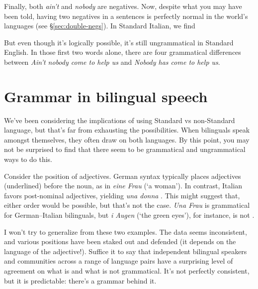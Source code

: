 Finally, both \textit{ain't} and \textit{nobody} are negatives. Now, despite what you may have been told, having two negatives in a sentences is perfectly normal in the world's languages (see \S\ref{sec:double-negs}). In Standard Italian, we find


\z

But even though it's logically possible, it's still ungrammatical in Standard English. In those first two words alone, there are four grammatical differences between \textit{Ain't nobody come to help us} and \textit{Nobody has come to help us}.



\section{Grammar in bilingual speech}

We've been considering the implications of using Standard vs non-Standard language, but that's far from exhausting the possibilities. When bilinguals speak amongst themselves, they often draw on both languages. By this point, you may not be surprised to find that there seem to be grammatical and ungrammatical ways to do this. 

Consider the position of adjectives. German syntax typically places adjectives (underlined) before the noun, as in \textit{eine  Frau}  (`a  woman'). In contrast, Italian favors post-nominal adjectives, yielding \textit{una donna }. This might suggest that, either order would be possible, but that's not the case. \textit{Una  Frau} is grammatical for German--Italian bilinguals, but \textit{i  Augen} (`the green eyes'), for instance, is not \citep{Cantone2009}. 

I won't try to generalize from these two examples. The data seems inconsistent, and various positions have been staked out and defended (it depends on the language of the adjective!). Suffice it to say that independent bilingual speakers and communities across a range of language pairs have a surprising level of agreement on what is and what is not grammatical. It's not perfectly consistent, but it is predictable: there's a grammar behind it.

